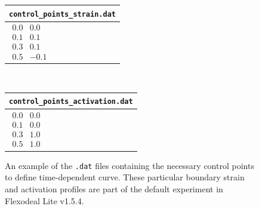 \documentclass{sfuthesis}
\numberwithin{equation}{section}
\numberwithin{figure}{chapter}
\numberwithin{table}{chapter}
\theoremstyle{definition}
\begin{document}
\begin{figure}
    \centering
    \begin{tabular}{|>{\centering\arraybackslash}m{6cm}|}
        \hline
        \texttt{control\_points\_strain.dat} \\ \hline
        $\begin{matrix}
          0.0 & 0.0 \\
          0.1 & 0.1 \\
          0.3 & 0.1 \\
          0.5 & -0.1
        \end{matrix}$ \\
        \hline
      \end{tabular}\hspace{1em}\scalebox{1.5}{$\Rightarrow$}\hspace{1em}
      \\
      \begin{tabular}{|>{\centering\arraybackslash}m{6cm}|}
        \hline
        \texttt{control\_points\_activation.dat} \\ \hline
        $\begin{matrix}
          0.0 & 0.0 \\
          0.1 & 0.0 \\
          0.3 & 1.0 \\
          0.5 & 1.0
        \end{matrix}$ \\
        \hline
      \end{tabular}\hspace{1em}\scalebox{1.5}{$\Rightarrow$}\hspace{1em}
    \caption{An example of the \texttt{.dat} files containing the necessary control points to define time-dependent curve. These particular boundary strain and activation profiles are part of the default experiment in Flexodeal Lite v1.5.4. \label{fig:flexodeal_lite_act_strain_profiles}}
\end{figure}
\end{document}
